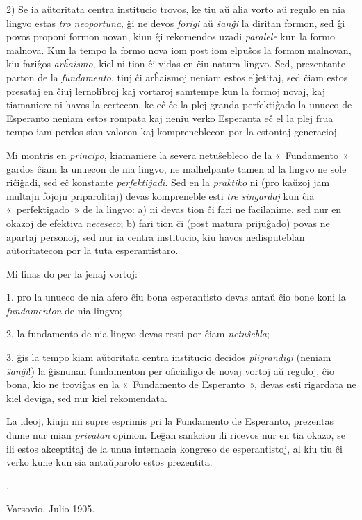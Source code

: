 2) Se ia aŭtoritata centra institucio trovos, ke tiu aŭ alia vorto aŭ regulo en nia lingvo estas \emph{tro neoportuna}, ĝi ne devos \emph{forigi} aŭ \emph{ŝanĝi} la diritan formon, sed ĝi povos proponi formon novan, kiun ĝi rekomendos uzadi \emph{paralele} kun la formo malnova. Kun la tempo la formo nova iom post iom elpuŝos la formon malnovan, kiu fariĝos \emph{arĥaismo}, kiel ni tion ĉi vidas en ĉiu natura lingvo. Sed, prezentante parton de la \emph{fundamento}, tiuj ĉi arĥaismoj neniam estos elĵetitaj, sed ĉiam estos presataj en ĉiuj lernolibroj kaj vortaroj samtempe kun la formoj novaj, kaj tiamaniere ni havos la certecon, ke eĉ ĉe la plej granda perfektiĝado la unueco de Esperanto neniam estos rompata kaj neniu verko Esperanta eĉ el la plej frua tempo iam perdos sian valoron kaj kompreneblecon por la estontaj generacioj.

Mi montris en \emph{principo}, kiamaniere la severa netuŝebleco de la «~Fundamento~» gardos ĉiam la unuecon de nia lingvo, ne malhelpante tamen al la lingvo ne sole riĉiĝadi, sed eĉ konstante \emph{perfektiĝadi}. Sed en la \emph{praktiko} ni (pro kaŭzoj jam multajn fojojn priparolitaj) devas kompreneble esti \emph{tre singardaj} kun ĉia «~perfektigado~» de la lingvo: a) ni devas tion ĉi fari ne facilanime, sed nur en okazoj de efektiva \emph{neceseco}; b) fari tion ĉi (post matura prijuĝado) povas ne apartaj personoj, sed nur ia centra institucio, kiu havos nedisputeblan aŭtoritatecon por la tuta esperantistaro.

Mi finas do per la jenaj vortoj:

1. pro la unueco de nia afero ĉiu bona esperantisto devas antaŭ ĉio bone koni la \emph{fundamenton} de nia lingvo;

2. la fundamento de nia lingvo devas resti por ĉiam \emph{netuŝebla};

3. ĝis la tempo kiam aŭtoritata centra institucio decidos \emph{pligrandigi} (neniam \emph{ŝanĝi}!) la ĝisnunan fundamenton per oficialigo de novaj vortoj aŭ reguloj, ĉio bona, kio ne troviĝas en la «~Fundamento de Esperanto~», devas esti rigardata ne kiel deviga, sed nur kiel rekomendata.

La ideoj, kiujn mi supre esprimis pri la Fundamento de Esperanto, prezentas dume nur mian \emph{privatan} opinion. Leĝan sankcion ili ricevos nur en tia okazo, se ili estos akceptitaj de la unua internacia kongreso de esperantistoj, al kiu tiu ĉi verko kune kun sia antaŭparolo estos prezentita.

\begin{flushright}
\small {}.~~~~~~~~~~~~~
\end{flushright}

{\footnotesize \hspace{3em} Varsovio, Julio 1905.}

\cleardoublepage

